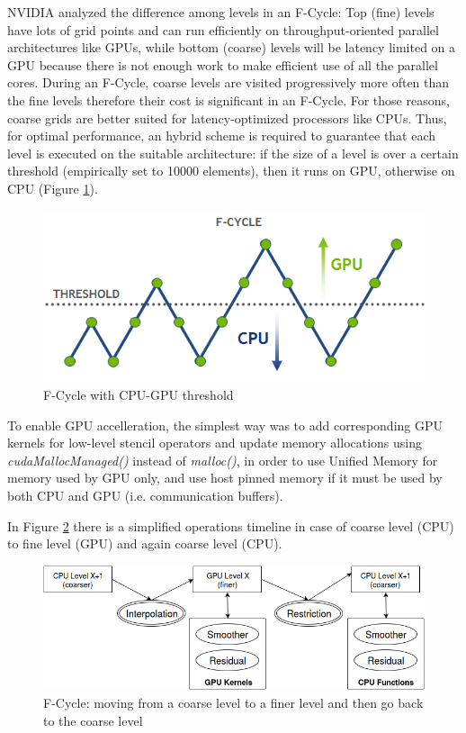 \documentclass[conference]{IEEEtran}
\begin{document}
NVIDIA analyzed the difference among levels in an F-Cycle: Top (fine) levels have lots of grid points and can run efficiently on throughput-oriented parallel architectures like GPUs, while bottom (coarse) levels will be latency limited on a GPU because there is not enough work to make efficient use of all the parallel cores. During an F-Cycle, coarse levels are visited progressively more often than the fine levels therefore their cost is significant in an F-Cycle. For those reasons, coarse grids are better suited for latency-optimized processors like CPUs.
Thus, for optimal performance, an hybrid scheme is required to guarantee that each level is executed on the suitable architecture: if the size of a level is over a certain threshold (empirically set to 10000 elements), then it runs on GPU, otherwise on CPU (Figure \ref{fig:hpgmg_fcycle}).

\begin{figure}[h]
\includegraphics[scale=0.6]{hpgmg_f_cycle.png}
\caption{F-Cycle with CPU-GPU threshold}
\label{fig:hpgmg_fcycle}
\end{figure}
 
To enable GPU accelleration, the simplest way was to add corresponding GPU kernels for low-level stencil operators and update memory allocations using \textit{cudaMallocManaged()} instead of \textit{malloc()}, in order to use Unified Memory \cite{unifiedmemory} for memory used by GPU only, and use host pinned memory if it must be used by both CPU and GPU (i.e. communication buffers).

In Figure \ref{fig:hpgmg_levels} there is a simplified operations timeline in case of coarse level (CPU) to fine level (GPU) and again coarse level (CPU).

\begin{figure}[h]
\includegraphics[scale=0.35]{hpgmg_levels.png}
\caption{F-Cycle: moving from a coarse level to a finer level and then go back to the coarse level}
\label{fig:hpgmg_levels}
\end{figure}
\end{document}
